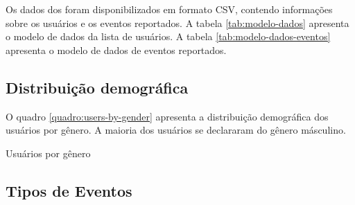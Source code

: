 Os dados dos foram disponibilizados em formato CSV, contendo informações sobre os usuários e os eventos reportados. A tabela \autoref{tab:modelo-dados} apresenta o modelo de dados da lista de usuários. A tabela \autoref{tab:modelo-dados-eventos} apresenta o modelo de dados de eventos reportados.

\subsection*{Distribuição demográfica}

O quadro \autoref{quadro:users-by-gender} apresenta a distribuição demográfica dos usuários por gênero. A maioria dos usuários se declararam do gênero másculino. 


\begin{quadro}[htb]
    \caption{Usuários por gênero}
    \label{quadro:users-by-gender}
    \centering
\end{quadro}

\subsection{Tipos de Eventos}

